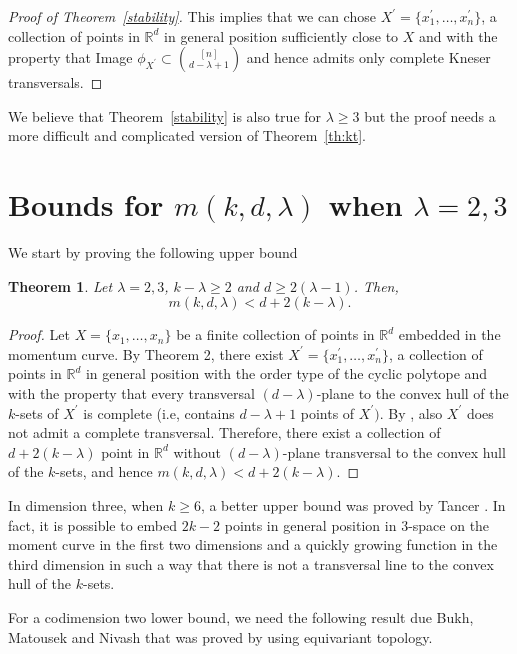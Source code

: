 \documentclass[11pt]{amsart}
\theoremstyle{plain}
\newtheorem{theorem}{Theorem}[section]
\theoremstyle{definition}
\theoremstyle{remark}
\begin{document}
\begin{proof}[Proof of Theorem~\ref{stability}]
This implies that we can chose $X^\prime=\{x^\prime_1,\dots ,x^\prime_n\}$, a collection of points in ${\mathbb{R}}^{d}$  in general position sufficiently close to $X$ and with the property that Image $\phi_{X^\prime} \subset \binom{[n]}{d-\lambda +1}$ and hence admits only complete Kneser transversals.
\end{proof}

We believe that Theorem~\ref{stability} is also true for $\lambda{\geqslant} 3$ but the proof needs a more difficult and complicated version of Theorem~\ref{th:kt}.

\section{Bounds for $m(k,d,\lambda)$ when $\lambda=2,3$}\label{sec:bound}

We start by proving the following upper bound

\begin{theorem}\label{th:bound}
Let $\lambda=2,3$, $k-\lambda {\geqslant} 2$ and $d{\geqslant} 2(\lambda-1)$. Then,
$$
m(k,d,\lambda)<d+2(k-\lambda).
$$
\end{theorem}

\begin{proof}
Let $X=\{x_1,\dots ,x_n\}$ be a finite collection of points in ${\mathbb{R}}^{d}$ embedded in the momentum curve. By Theorem 2,  there exist $X^\prime=\{x^\prime_1,\dots ,x^\prime_n\}$, a collection of points in ${\mathbb{R}}^{d}$  in general position with the order type of the cyclic polytope  and with the property that every transversal $(d-\lambda)$-plane to the convex hull of the $k$-sets of $X^\prime$ is complete (i.e,  contains  $d-\lambda +1$ points of $X^\prime)$. By \cite[Theorem 1.2]{CMMMR}, also $X^\prime$ does not admit  a complete transversal. Therefore,  there exist a collection of  $d+2(k-\lambda)$ point in ${\mathbb{R}}^{d}$ without $(d-\lambda)$-plane transversal to the convex hull of the $k$-sets, and hence $m(k,d,\lambda)<d+2(k-\lambda)$.
\end{proof}

In dimension three, when $k{\geqslant} 6$, a better upper bound was proved by Tancer \cite{T}. In fact, it is possible to embed $2k-2$ points in general position in $3$-space on the moment curve in the first two dimensions and a quickly growing function in the third dimension in such a way that there is not  a transversal line to the convex hull of the $k$-sets.
\medskip

For a codimension two lower bound, we need the following result due Bukh, Matousek and Nivash \cite{BMN} that was proved by using equivariant topology.
\end{document}
